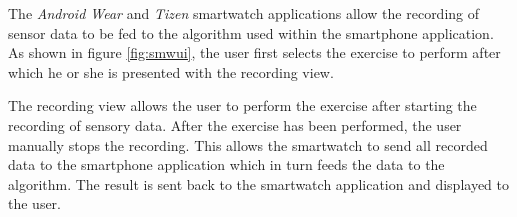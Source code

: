 The \textit{Android Wear} and \textit{Tizen} smartwatch applications allow the
recording of sensor data to be fed to the algorithm used within the
smartphone application. As shown in figure \ref{fig:smwui}, the user first
selects the exercise to perform after which he or she is presented with the
recording view.

The recording view allows the user to perform the exercise after starting the
recording of sensory data. After the exercise has been performed, the user
manually stops the recording. This allows the smartwatch to send all recorded
data to the smartphone application which in turn feeds the data to the
algorithm. The result is sent back to the smartwatch application and displayed
to the user.
